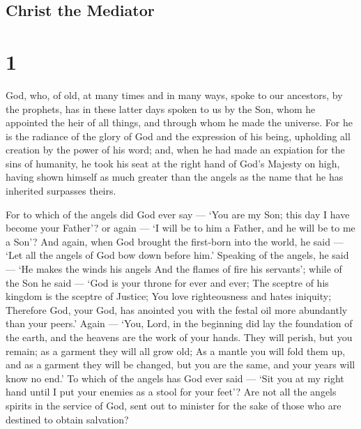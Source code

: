 \hypertarget{christ-the-mediator}{%
\subsection{Christ the Mediator}\label{christ-the-mediator}}

\hypertarget{section}{%
\section{1}\label{section}}

 God, who, of old, at many times and in many ways, spoke to
our ancestors, by the prophets,  has in these latter days
spoken to us by the Son, whom he appointed the heir of all things, and
through whom he made the universe.  For he is the radiance
of the glory of God and the expression of his being, upholding all
creation by the power of his word; and, when he had made an expiation
for the sins of humanity, he took his seat at the right hand of God's
Majesty on high,  having shown himself as much greater than
the angels as the name that he has inherited surpasses theirs.

 For to which of the angels did God ever say --- `You are my
Son; this day I have become your Father'? or again --- `I will be to him
a Father, and he will be to me a Son'?  And again, when God
brought the first-born into the world, he said --- `Let all the angels
of God bow down before him.'  Speaking of the angels, he
said --- `He makes the winds his angels And the flames of fire his
servants';  while of the Son he said --- `God is your throne
for ever and ever; The sceptre of his kingdom is the sceptre of Justice;
 You love righteousness and hates iniquity; Therefore God,
your God, has anointed you with the festal oil more abundantly than your
peers.'  Again --- `You, Lord, in the beginning did lay the
foundation of the earth, and the heavens are the work of your hands.
 They will perish, but you remain; as a garment they will
all grow old;  As a mantle you will fold them up, and as a
garment they will be changed, but you are the same, and your years will
know no end.'  To which of the angels has God ever said ---
`Sit you at my right hand until I put your enemies as a stool for your
feet'?  Are not all the angels spirits in the service of
God, sent out to minister for the sake of those who are destined to
obtain salvation?

